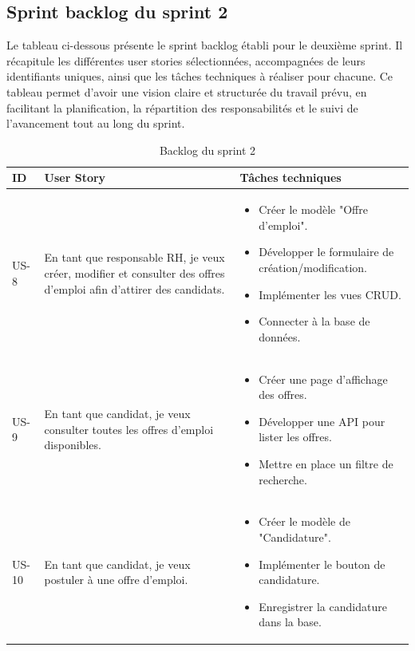 \subsection{ Sprint backlog du sprint 2}
Le tableau ci-dessous présente le sprint backlog établi pour le deuxième sprint. Il récapitule les différentes user stories sélectionnées, accompagnées de leurs identifiants uniques, ainsi que les tâches techniques à réaliser pour chacune. Ce tableau permet d’avoir une vision claire et structurée du travail prévu, en facilitant la planification, la répartition des responsabilités et le suivi de l’avancement tout au long du sprint.
\begin{table}[H]
\caption{Backlog du sprint 2}
\centering
\begin{tabular}{|p{1cm}|p{8cm}|p{8cm}|}
\hline
\textbf{ID} & \textbf{User Story} & \textbf{Tâches techniques} \\
\hline
US-8 & En tant que responsable RH, je veux créer, modifier et consulter des offres d’emploi afin d’attirer des candidats. 
& 
\begin{itemize}[leftmargin=*]
  \item Créer le modèle "Offre d'emploi".
  \item Développer le formulaire de création/modification.
  \item Implémenter les vues CRUD.
  \item Connecter à la base de données.
\end{itemize} \\
\hline
US-9 & En tant que candidat, je veux consulter toutes les offres d’emploi disponibles. 
& 
\begin{itemize}[leftmargin=*]
  \item Créer une page d'affichage des offres.
  \item Développer une API pour lister les offres.
  \item Mettre en place un filtre de recherche.
\end{itemize} \\
\hline
US-10 & En tant que candidat, je veux postuler à une offre d’emploi. 
& 
\begin{itemize}[leftmargin=*]
  \item Créer le modèle de "Candidature".
  \item Implémenter le bouton de candidature.
  \item Enregistrer la candidature dans la base.
\end{itemize} \\
\hline

\end{tabular}
\end{table}

